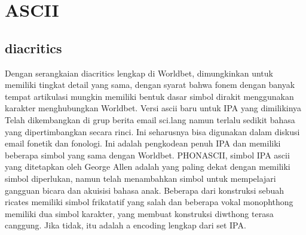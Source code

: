 \section{ASCII}
	\subsection{diacritics}
	Dengan serangkaian diacritics lengkap di Worldbet, dimungkinkan untuk memiliki tingkat detail yang sama,
dengan syarat bahwa fonem dengan banyak tempat artikulasi mungkin memiliki bentuk dasar
simbol dirakit menggunakan karakter menghubungkan Worldbet. Versi ascii baru untuk IPA yang dimilikinya
Telah dikembangkan di grup berita email sci.lang namun terlalu sedikit bahasa yang dipertimbangkan secara rinci. Ini seharusnya bisa digunakan dalam diskusi email
fonetik dan fonologi. Ini adalah pengkodean penuh IPA dan memiliki beberapa simbol yang sama dengan
Worldbet.
PHONASCII, simbol IPA ascii yang ditetapkan oleh George Allen adalah yang paling dekat dengan memiliki simbol
diperlukan, namun telah menambahkan simbol untuk mempelajari gangguan bicara dan akuisisi bahasa anak. Beberapa
dari konstruksi sebuah ricates memiliki simbol frikatatif yang salah dan beberapa vokal monophthong
memiliki dua simbol karakter, yang membuat konstruksi diwthong terasa canggung. Jika tidak, itu adalah a
encoding lengkap dari set IPA.	